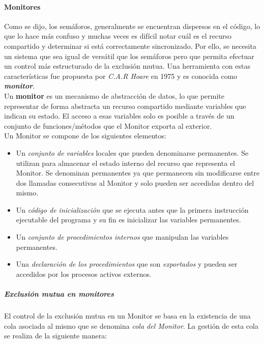 \paragraph{Monitores}
Como se dijo, los semáforos, generalmente se encuentran dispersos en el código, lo que lo hace más confuso y muchas veces es difícil notar cuál es el recurso compartido y determinar si está correctamente sincronizado. Por ello, se necesita un sistema que sea igual de versátil que los semáforos pero que permita efectuar un control más estructurado de la exclusión mutua. Una herramienta con estas características fue propuesta por \textit{C.A.R Hoare} en 1975 y es conocida como \textbf{\textit{monitor}}.\\
Un \textbf{monitor} es un mecanismo de abstracción de datos, lo que permite representar de forma abstracta un recurso compartido mediante variables que indican su estado. El acceso a esas variables solo es posible a través de un conjunto de funciones/métodos que el Monitor exporta al exterior.\\

Un Monitor se compone de los siguientes elementos:
\begin{itemize}
    \item Un \textit{conjunto de variables} locales que pueden denominarse permanentes. Se utilizan para almacenar el estado interno del recurso que representa el Monitor. Se denominan permanentes ya que permanecen sin modificarse entre dos llamadas consecutivas al Monitor y solo pueden ser accedidas dentro del mismo.
    
    \item Un \textit{código de inicialización} que se ejecuta antes que la primera instrucción ejecutable del programa y su fin es inicializar las variables permanentes. 

    \item Un \textit{conjunto de procedimientos internos} que manipulan las variables permanentes.
    
    \item Una \textit{declaración de los procedimientos} que son \textit{exportados} y pueden ser accedidos por los procesos activos externos.
\end{itemize}

\subparagraph{Exclusión mutua en monitores}
\hfill
\par El control de la exclusión mutua en un Monitor se basa en la existencia de una cola asociada al mismo que se denomina \textit{cola del Monitor}. La gestión de esta cola se realiza de la siguiente manera:

